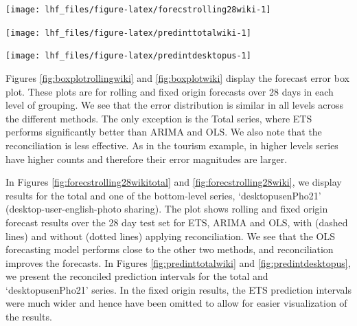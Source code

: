 \documentclass[11pt,a4paper,]{article}
\let\origfigure\figure
\let\endorigfigure\endfigure
\renewenvironment{figure}[1][2] {
    \expandafter\origfigure\expandafter[!htbp]
} {
    \endorigfigure
}
\begin{document}
\begin{figure}

{\centering \texttt{[image: lhf\_files/figure-latex/forecstrolling28wiki-1]} 

}

\caption{Comparing reconciled and unreconciled ETS, ARIMA and OLS rolling and fixed origin forecasts for Wikipedia pageviews 'desktopusenPho21' bottom-level series}\label{fig:forecstrolling28wiki}
\end{figure}

\begin{figure}

{\centering \texttt{[image: lhf\_files/figure-latex/predinttotalwiki-1]} 

}

\caption{The actual test set for the 'Total series' compared to the forecasts from reconciled and unreconciled OLS methods with prediction interval for rolling and fixed origin Wikipedia pageviews.}\label{fig:predinttotalwiki}
\end{figure}

\begin{figure}

{\centering \texttt{[image: lhf\_files/figure-latex/predintdesktopus-1]} 

}

\caption{The actual test set for the 'desktopusenPho21' bottom level series compared to the forecasts from reconciled and unreconciled OLS methods with prediction interval for rolling and fixed origin  Wikipedia pageviews.}\label{fig:predintdesktopus}
\end{figure}

Figures \ref{fig:boxplotrollingwiki} and \ref{fig:boxplotwiki} display the forecast error box plot. These plots are for rolling and fixed origin forecasts over 28 days in each level of grouping. We see that the error distribution is similar in all levels across the different methods. The only exception is the Total series, where ETS performs significantly better than ARIMA and OLS. We also note that the reconciliation is less effective. As in the tourism example, in higher levels series have higher counts and therefore their error magnitudes are larger.

In Figures \ref{fig:forecstrolling28wikitotal} and \ref{fig:forecstrolling28wiki}, we display results for the total and one of the bottom-level series, `desktopusenPho21' (desktop-user-english-photo sharing). The plot shows rolling and fixed origin forecast results over the 28 day test set for ETS, ARIMA and OLS, with (dashed lines) and without (dotted lines) applying reconciliation. We see that the OLS forecasting model performs close to the other two methods, and reconciliation improves the forecasts. In Figures \ref{fig:predinttotalwiki} and \ref{fig:predintdesktopus}, we present the reconciled prediction intervals for the total and `desktopusenPho21' series. In the fixed origin results, the ETS prediction intervals were much wider and hence have been omitted to allow for easier visualization of the results.
\end{document}
